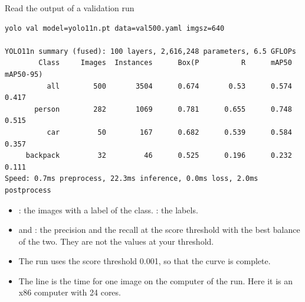 \begin{frame}[fragile]{Read the output of a validation run}
\begin{lstlisting}[style=shell]
yolo val model=yolo11n.pt data=val500.yaml imgsz=640

YOLO11n summary (fused): 100 layers, 2,616,248 parameters, 6.5 GFLOPs
        Class     Images  Instances      Box(P          R      mAP50  mAP50-95)
          all        500       3504      0.674       0.53      0.574      0.417
       person        282       1069      0.781      0.655      0.748      0.515
          car         50        167      0.682      0.539      0.584      0.357
     backpack         32         46      0.525      0.196      0.232      0.111
Speed: 0.7ms preprocess, 22.3ms inference, 0.0ms loss, 2.0ms postprocess
\end{lstlisting}
  \small
  \begin{itemize}
    \item {}: the images with a label of the class.
          : the labels.
    \item {} and : the precision and the recall at the score
          threshold with the best balance of the two. They are not the
          values at your threshold.
    \item The run uses the score threshold 0.001, so that the curve is
          complete.
    \item The line  is the time for one image on the computer of
          the run. Here it is an x86 computer with 24 cores.
  \end{itemize}
\end{frame}

